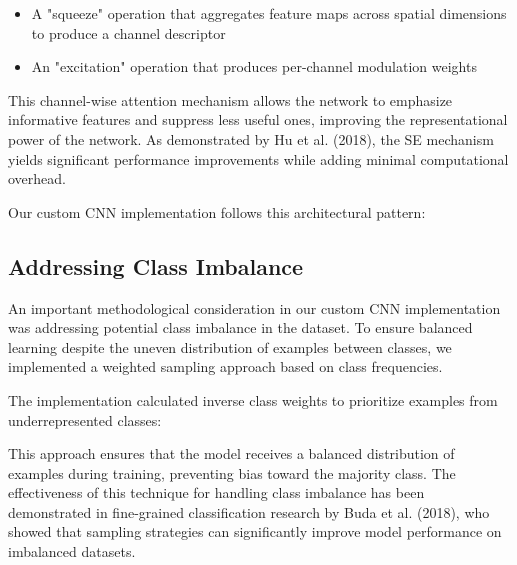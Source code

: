 \documentclass[a4paper,12pt]{article}
\begin{document}
\begin{itemize}
    \item A "squeeze" operation that aggregates feature maps across spatial dimensions to produce a channel descriptor
    \item An "excitation" operation that produces per-channel modulation weights
\end{itemize}

This channel-wise attention mechanism allows the network to emphasize informative features and suppress less useful ones, improving the representational power of the network. As demonstrated by Hu et al. (2018), the SE mechanism yields significant performance improvements while adding minimal computational overhead.

Our custom CNN implementation follows this architectural pattern:



\subsection{Addressing Class Imbalance}

An important methodological consideration in our custom CNN implementation was addressing potential class imbalance in the dataset. To ensure balanced learning despite the uneven distribution of examples between classes, we implemented a weighted sampling approach based on class frequencies.

The implementation calculated inverse class weights to prioritize examples from underrepresented classes:


This approach ensures that the model receives a balanced distribution of examples during training, preventing bias toward the majority class. The effectiveness of this technique for handling class imbalance has been demonstrated in fine-grained classification research by Buda et al. (2018), who showed that sampling strategies can significantly improve model performance on imbalanced datasets.
\end{document}
